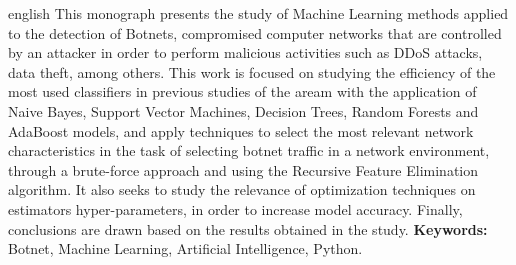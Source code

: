 \begin{resumo}[Abstract]
 \begin{otherlanguage*}{english}
This monograph presents the study of Machine Learning methods applied to the detection of Botnets, compromised computer networks that are controlled by an attacker in order to perform malicious activities such as DDoS attacks, data theft, among others. This work is focused on studying the efficiency of the most used classifiers in previous studies of the aream with the application of Naive Bayes, Support Vector Machines, Decision Trees, Random Forests and AdaBoost models, and apply techniques to select the most relevant network characteristics in the task of selecting botnet traffic in a network environment, through a brute-force approach and using the Recursive Feature Elimination algorithm. It also seeks to study the relevance of optimization techniques on estimators hyper-parameters, in order to increase model accuracy. Finally, conclusions are drawn based on the results obtained in the study. \linebreak
\textbf{Keywords:} Botnet, Machine Learning, Artificial Intelligence, Python.
 \end{otherlanguage*}
\end{resumo}
